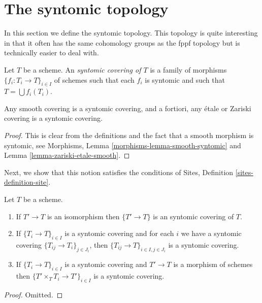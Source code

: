 \section{The syntomic topology}
\label{section-syntomic}

\noindent
In this section we define the syntomic topology.
This topology is quite interesting in that it often
has the same cohomology groups as the fppf topology
but is technically easier to deal with.

\begin{definition}
\label{definition-syntomic-covering}
Let $T$ be a scheme. An {\it syntomic covering of $T$} is a family
of morphisms $\{f_i : T_i \to T\}_{i \in I}$ of schemes
such that each $f_i$ is syntomic and such
that $T = \bigcup f_i(T_i)$.
\end{definition}

\begin{lemma}
\label{lemma-zariski-etale-smooth-syntomic}
Any smooth covering is a syntomic covering, and a fortiori,
any \'etale or Zariski covering is a syntomic covering.
\end{lemma}

\begin{proof}
This is clear from the definitions and the fact that a smooth
morphism is syntomic, see
Morphisms, Lemma \ref{morphisms-lemma-smooth-syntomic}
and Lemma \ref{lemma-zariski-etale-smooth}.
\end{proof}

\noindent
Next, we show that this notion satisfies the conditions of
Sites, Definition \ref{sites-definition-site}.

\begin{lemma}
\label{lemma-syntomic}
Let $T$ be a scheme.
\begin{enumerate}
\item If $T' \to T$ is an isomorphism then $\{T' \to T\}$
is an syntomic covering of $T$.
\item If $\{T_i \to T\}_{i\in I}$ is a syntomic covering and for each
$i$ we have a syntomic covering $\{T_{ij} \to T_i\}_{j\in J_i}$, then
$\{T_{ij} \to T\}_{i \in I, j\in J_i}$ is a syntomic covering.
\item If $\{T_i \to T\}_{i\in I}$ is a syntomic covering
and $T' \to T$ is a morphism of schemes then
$\{T' \times_T T_i \to T'\}_{i\in I}$ is a syntomic covering.
\end{enumerate}
\end{lemma}

\begin{proof}
Omitted.
\end{proof}

